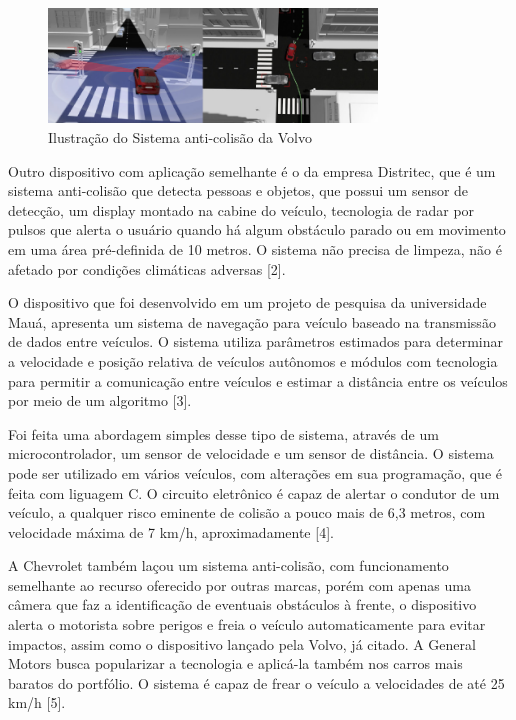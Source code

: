  \begin{figure}[h]
   \centering
   \includegraphics[width=330px, scale=0.5]{figuras/sistemavolvo}
   \caption{Ilustração do Sistema anti-colisão da Volvo}
   \label{fig:sistemavolvo}
 \end{figure}

Outro dispositivo com aplicação semelhante é o da empresa Distritec, que é um sistema anti-colisão que detecta pessoas e objetos, que possui
um sensor de detecção, um display montado na cabine do veículo, tecnologia de radar por pulsos que alerta o usuário quando há algum obstáculo
 parado ou em movimento em uma área pré-definida de 10 metros. O sistema não precisa de limpeza, não é afetado por condições climáticas adversas
  [2].

O dispositivo que foi desenvolvido em um projeto de pesquisa da universidade Mauá, apresenta um sistema de navegação para veículo baseado na
transmissão de dados entre veículos. O sistema utiliza parâmetros estimados para determinar a velocidade e posição relativa de veículos autônomos
e módulos com tecnologia para permitir a comunicação entre veículos e estimar a distância entre os veículos por meio de um algoritmo [3].

Foi feita uma abordagem simples desse tipo de sistema, através de um microcontrolador, um sensor de velocidade e um sensor de distância. O sistema
 pode ser utilizado em vários veículos, com alterações em sua programação, que é feita com liguagem C. O circuito eletrônico é capaz de alertar o
 condutor de um veículo, a qualquer risco eminente de colisão a pouco mais de 6,3 metros, com velocidade máxima de 7 km/h, aproximadamente [4].

A Chevrolet também laçou um sistema anti-colisão, com funcionamento semelhante ao recurso oferecido por outras marcas, porém com apenas uma câmera
 que faz a identificação de eventuais obstáculos à frente, o dispositivo alerta o motorista sobre perigos e freia o veículo automaticamente para
 evitar impactos, assim como o dispositivo lançado pela Volvo, já citado. A General Motors busca popularizar a tecnologia e aplicá-la também nos
 carros mais baratos do portfólio. O sistema é capaz de frear o veículo a velocidades de até 25 km/h [5].

